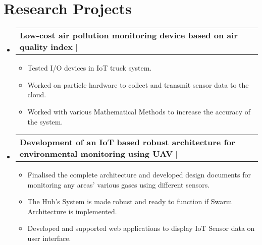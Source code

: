 \documentclass[letterpaper,11pt]{article}
\makeatletter
\newcommand{\resumeItem}[1]{
  \item\small{
    {#1 \vspace{-2pt}}
  }
}
\newcommand{\resumeProjectHeading}[2]{
    \item
    \begin{tabular*}{1.001\textwidth}{l@{\extracolsep{\fill}}r}
      \small#1 & \textbf{\small }\\
    \end{tabular*}\vspace{-7pt}
}
\newcommand{\resumeSubHeadingListStart}{\begin{itemize}[leftmargin=0.0in, label={}]}
\newcommand{\resumeSubHeadingListEnd}{\end{itemize}}
\newcommand{\resumeItemListStart}{\begin{itemize}}
\newcommand{\resumeItemListEnd}{\end{itemize}\vspace{-5pt}}
\makeatother
\begin{document}
\smallskip
\section{Research Projects}
    \vspace{-5pt}
    \resumeSubHeadingListStart
    \resumeProjectHeading
    {\textbf{Low-cost air pollution monitoring device based on air quality index} $|$ {\href{https://papers.ssrn.com/sol3/papers.cfm?abstract_id=3515043}{\faIcon{link}{ Link}}}}{}%
          \resumeItemListStart
            \resumeItem{Tested I/O devices in IoT truck system.}
            \resumeItem{Worked on particle hardware to collect and transmit sensor data to the cloud.}
            \resumeItem{Worked with various Mathematical Methods to increase the accuracy of the system.}
          \resumeItemListEnd
    \vspace{-13pt}
      \resumeProjectHeading
          {\textbf{Development of an IoT based robust architecture for environmental monitoring using UAV} $|$ {\href{https://ieeexplore.ieee.org/document/9028987}{\faIcon{link}{ Link}}}}{}
          \resumeItemListStart
            \resumeItem{Finalised the complete architecture and developed design documents for monitoring any areas' various gases using different sensors.}
            \resumeItem{The Hub's System is made robust and ready to function if Swarm Architecture is implemented.}
            \resumeItem{Developed and supported web applications to display IoT Sensor data on user interface.}
          \resumeItemListEnd
    \resumeSubHeadingListEnd
\vspace{-15pt}

\smallskip
\end{document}
